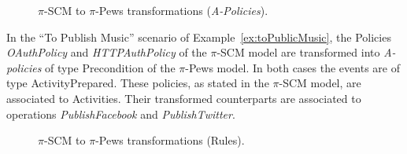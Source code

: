 \begin{figure}
\caption{ $\pi$-SCM to $\pi$-{\sc Pews} transformations (\textit{A-Policies}).}
\label{fig:transformationsB}
\end{figure}

\begin{example}
In the ``To Publish Music'' scenario of Example~\ref{ex:toPublicMusic}, the {\sf Policies} {\em OAuthPolicy} and {\em HTTPAuthPolicy} of the $\pi$-SCM model are transformed into {\em A-policies} of type {\sf Precondition} of the $\pi$-{\sc Pews} model. 
In both cases the events are of type {\sf ActivityPrepared}. 
These policies, as stated in the $\pi$-SCM model, are associated to {\sf Activities}. 
Their transformed counterparts are associated to operations {\em PublishFacebook} and {\em PublishTwitter}.
\end{example}

\begin{figure}
\caption{ $\pi$-SCM to $\pi$-{\sc Pews} transformations (Rules).}
\label{fig:transformationsC}
\end{figure}
